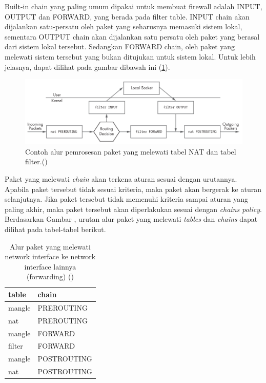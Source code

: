 Built-in chain yang paling umum dipakai untuk membuat firewall adalah INPUT, OUTPUT dan FORWARD, yang berada pada filter table. INPUT chain akan dijalankan satu-persatu oleh paket yang seharusnya memasuki sistem lokal, sementara OUTPUT chain akan dijalankan satu persatu oleh paket yang berasal dari sistem lokal tersebut. Sedangkan FORWARD chain, oleh paket yang melewati sistem tersebut yang bukan ditujukan untuk sistem lokal. Untuk lebih jelasnya, dapat dilihat pada gambar dibawah ini (\ref{fig:iptables_packet_flow}). 
\begin{figure}[H]
	\centering
	\includegraphics[width=\textwidth]{resources/iptables_packet_flow.png}
	\caption{Contoh alur pemrosesan paket yang melewati tabel NAT dan tabel filter.(\cite{rash2007linux})}
	\label{fig:iptables_packet_flow}
\end{figure}

Paket yang melewati \textit{chain} akan terkena aturan sesuai dengan urutannya. Apabila paket tersebut tidak sesuai kriteria, maka paket akan bergerak ke aturan selanjutnya. Jika paket tersebut tidak memenuhi kriteria sampai aturan yang paling akhir, maka paket tersebut akan diperlakukan sesuai dengan \textit{chain\textquotesingle s policy}. 
Berdasarkan Gambar , urutan alur paket yang melewati \textit{tables} dan \textit{chains} dapat dilihat pada tabel-tabel berikut.

\begin{table}[H]
	\caption{Alur paket yang melewati network interface ke network interface lainnya (forwarding) (\cite{purdy2004linux})}
	\label{table:network_to_network}
	\centering
	\begin{tabular}{ll}
		\hline
		\rowcolor[HTML]{C0C0C0} 
		table  & chain       \\ \hline
		mangle & PREROUTING  \\
		nat    & PREROUTING  \\
		mangle & FORWARD     \\
		filter & FORWARD     \\
		mangle & POSTROUTING \\
		nat    & POSTROUTING \\ \hline
	\end{tabular}
\end{table}


